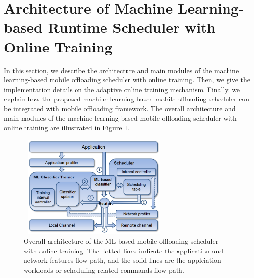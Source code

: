 \documentclass[10pt, conference, compsocconf]{IEEEtran}
\begin{document}
\section{Architecture of Machine Learning-based Runtime Scheduler with
Online Training}
%
In this section, we describe the architecture and main modules of the
machine learning-based mobile offloading scheduler with online training.
%
Then, we give the implementation details on the adaptive online training
mechanism.
%
Finally, we explain how the proposed machine learning-based mobile
offloading scheduler can be integrated with mobile offloading framework.
%
The overall architecture and main modules of the machine learning-based
mobile offloading scheduler with online training are illustrated in
Figure 1.
%
\begin{figure}
\centering
\includegraphics[height=5.1cm, width=7.6cm]{Figure/figure1}
\caption{Overall architecture of the ML-based mobile offloading
scheduler with online training. The dotted lines indicate the
application and network features flow path, and the solid lines are the
applciation workloads or scheduling-related commands flow path.}
\end{figure}
%
\end{document}
